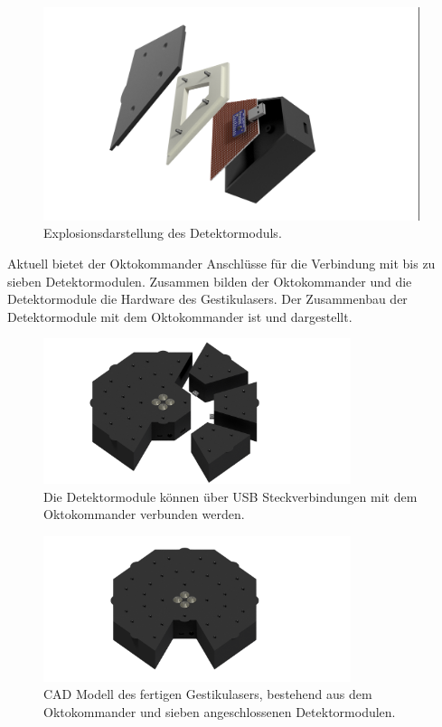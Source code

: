 \begin{figure}[H]
	\centering
	\includegraphics[width=11cm]{../CAD_Bilder/Detektormodul_raytraced.png}
	\caption{Explosionsdarstellung des Detektormoduls.}
	\label{fig:DetektorZusammenbau}
\end{figure}
\noindent
Aktuell bietet der Oktokommander Anschlüsse für die Verbindung mit bis zu sieben Detektormodulen. Zusammen bilden der Oktokommander und die Detektormodule die Hardware des Gestikulasers. Der Zusammenbau der Detektormodule mit dem Oktokommander ist  und  dargestellt.
\begin{figure}[h]
	\centering
	\includegraphics[width=9cm]{../CAD_Bilder/Gestikulaser_raytraced_4.png}
	\caption{Die Detektormodule können über USB Steckverbindungen mit dem Oktokommander verbunden werden.}
	\label{fig:GestikulaserModular}
\end{figure}
\begin{figure}[h]
	\centering
	\includegraphics[width=9cm]{../CAD_Bilder/Gestikulaser_raytraced.png}
	\caption{CAD Modell des fertigen Gestikulasers, bestehend aus dem Oktokommander und sieben angeschlossenen Detektormodulen.}
	\label{fig:GestikulaserKombiniert}
\end{figure}


